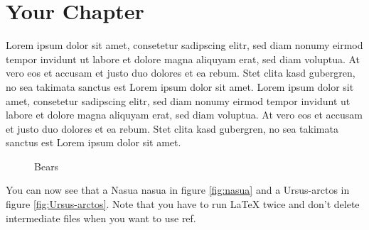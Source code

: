 \documentclass[a4paper]{scrreprt}
\begin{document}
\chapter{Your Chapter}
Lorem ipsum dolor sit amet, consetetur sadipscing elitr, sed diam
nonumy eirmod tempor invidunt ut labore et dolore magna aliquyam
erat, sed diam voluptua. At vero eos et accusam et justo duo dolores
et ea
rebum. Stet clita kasd gubergren, no sea takimata sanctus est Lorem
ipsum dolor sit amet. Lorem ipsum dolor sit amet, consetetur
sadipscing elitr, sed diam nonumy eirmod tempor invidunt ut labore et
dolore magna aliquyam erat, sed diam voluptua. At vero eos et accusam
et justo duo dolores et ea rebum. Stet clita kasd gubergren, no sea
takimata sanctus est Lorem ipsum dolor sit amet.

\begin{figure}[ht]
    \centering
    \label{fig:formen}
    \caption{Bears}
\end{figure}

You can now see that a Nasua nasua in figure \ref{fig:nasua} and a Ursus-arctos
in figure \ref{fig:Ursus-arctos}. Note that you have to run LaTeX twice and
don't delete intermediate files when you want to use ref.
\end{document}
